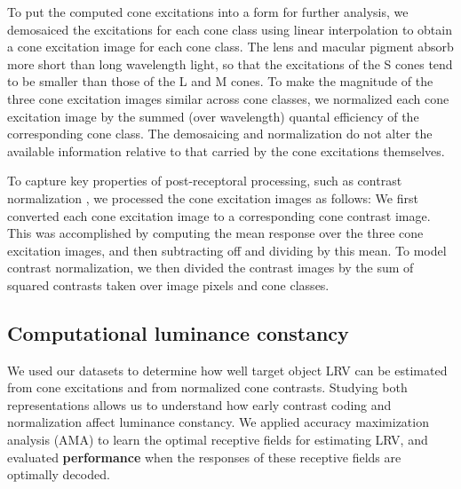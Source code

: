 \documentclass{jov}
\providecommand{\DIFaddtex}[1]{{\bf #1}} %
\providecommand{\DIFdeltex}[1]{} %
\providecommand{\DIFaddbegin}{} %
\providecommand{\DIFaddend}{} %
\providecommand{\DIFdelbegin}{} %
\providecommand{\DIFdelend}{} %
\providecommand{\DIFadd}[1]{\texorpdfstring{\DIFaddtex{#1}}{#1}} %
\providecommand{\DIFdel}[1]{\texorpdfstring{\DIFdeltex{#1}}{}} %
\newcommand{\DIFscaledelfig}{0.5}
\newlength{\DIFdelgraphicswidth} %
\newlength{\DIFdelgraphicsheight} %
\newcommand{\DIFaddincludegraphics}[2][]{{\color{blue}\fbox{\DIFOincludegraphics[#1]{#2}}}} %
\newcommand{\DIFdelincludegraphics}[2][]{%
\sbox{\DIFdelgraphicsbox}{\DIFOincludegraphics[#1]{#2}}%
\settoboxwidth{\DIFdelgraphicswidth}{\DIFdelgraphicsbox} %
\settoboxtotalheight{\DIFdelgraphicsheight}{\DIFdelgraphicsbox} %
\scalebox{\DIFscaledelfig}{%
\parbox[b]{\DIFdelgraphicswidth}{\usebox{\DIFdelgraphicsbox}\\[-\baselineskip] \rule{\DIFdelgraphicswidth}{0em}}\llap{\resizebox{\DIFdelgraphicswidth}{\DIFdelgraphicsheight}{%
\setlength{\unitlength}{\DIFdelgraphicswidth}%
\begin{picture}(1,1)%
\thicklines\linethickness{2pt} %
{\color[rgb]{1,0,0}\put(0,0){\framebox(1,1){}}}%
{\color[rgb]{1,0,0}\put(0,0){\line( 1,1){1}}}%
{\color[rgb]{1,0,0}\put(0,1){\line(1,-1){1}}}%
\end{picture}%
}\hspace*{3pt}}} %
} %
\DeclareRobustCommand{\DIFaddbegin}{\DIFOaddbegin \let\includegraphics\DIFaddincludegraphics} %
\DeclareRobustCommand{\DIFaddend}{\DIFOaddend \let\includegraphics\DIFOincludegraphics} %
\DeclareRobustCommand{\DIFdelbegin}{\DIFOdelbegin \let\includegraphics\DIFdelincludegraphics} %
\DeclareRobustCommand{\DIFdelend}{\DIFOaddend \let\includegraphics\DIFOincludegraphics} %
\begin{document}
To put the computed cone excitations into a form for further analysis, we demosaiced the excitations for each cone class using linear interpolation
to obtain a cone excitation image for each cone class.
The lens and macular pigment absorb more short than long wavelength light, so that the excitations of the S cones tend to be
smaller than those of the L and M cones.
To make the magnitude of the three cone excitation images similar across cone classes, we
normalized each cone excitation image by the summed (over wavelength) quantal efficiency of the corresponding cone class.
The demosaicing and normalization do not alter the available information relative to that carried by the cone excitations themselves. 

To capture key properties of post-receptoral processing, such as contrast normalization \cite{heeger1992normalization,albrecht1991motion,carandini2012normalization}, 
we processed the cone excitation images as follows:
We first converted each cone excitation image to a corresponding cone contrast image.
This was accomplished by computing the mean response over the three cone excitation images, and then subtracting off and dividing by this mean.
To model contrast normalization, we then divided the contrast images by the sum of squared contrasts taken over image pixels and cone classes.

\subsection{Computational luminance constancy} \label{method:SupervisedLearning}
We used our datasets to determine how well target object LRV can be estimated from cone excitations and from normalized cone contrasts.
Studying both representations allows us to understand how early contrast coding and normalization affect luminance constancy.
We applied accuracy maximization analysis (AMA) to learn the optimal receptive fields for estimating LRV,
and evaluated \DIFdelbegin \DIFdel{the performance obtained }\DIFdelend \DIFaddbegin \DIFadd{performance }\DIFaddend when the responses of these receptive fields are optimally decoded.
\end{document}
